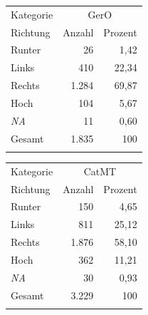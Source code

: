 


\begin{table}
    \begin{minipage}{0.5\textwidth}\centering
        \begin{tabular}{lrr} 
        \lsptoprule
         Kategorie & \multicolumn{2}{c}{{GerO}} \\ 
         \cmidrule(lr){2-3}
            {Richtung} & \multicolumn{1}{c}{Anzahl} & \multicolumn{1}{c}{Prozent} \\ 
            \midrule
            Runter & 26 & 1,42 \\ 
            Links & 410 & 22,34 \\ 
            Rechts & 1.284 & 69,87 \\ 
            Hoch & 104 & 5,67 \\ 
            \emph{NA} & 11 & 0,60 \\ 
            \midrule
            {Gesamt} & 1.835 & 100 \\ 
            \lspbottomrule
            \end{tabular}
            \end{minipage}\begin{minipage}{0.5\textwidth}\centering
             \begin{tabular}{lrr} 
             \lsptoprule
             Kategorie & \multicolumn{2}{c}{{CatMT}} \\ 
             \cmidrule(lr){2-3}
            {Richtung} & \multicolumn{1}{c}{Anzahl} & \multicolumn{1}{c}{Prozent}  \\ 
            \midrule
            Runter & 150 & 4,65 \\ 
            Links & 811 & 25,12 \\ 
            Rechts & 1.876 & 58,10 \\ 
            Hoch & 362 & 11,21 \\ 
            \emph{NA} & 30 & 0,93 \\ 
            \midrule
            {Gesamt} & 3.229 & 100 \\ 
            \lspbottomrule
         \end{tabular}    
    \end{minipage}\medskip\\

\end{table}
